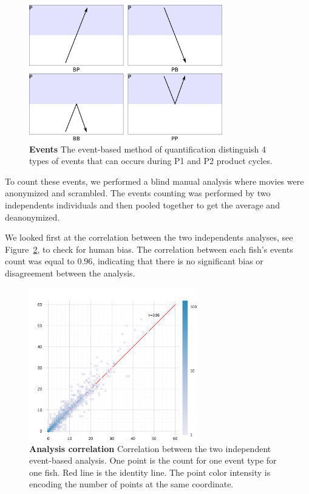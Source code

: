     \begin{figure}[htb]
      \centering
      \includegraphics[width=0.75\textwidth]{part_2/assets/events.png}
      \caption{\textbf{Events} The event-based method of quantification distinguish 4 types of events that can occurs during P1 and P2 product cycles.}
      \label{events}
    \end{figure}

  To count these events, we performed a blind manual analysis where movies were anonymized and scrambled. The events counting was performed by two independents individuals and then pooled together to get the average and deanonymized.

  We looked first at the correlation between the two independents analyses, see Figure~\ref{correlation_count}, to check for human bias. The correlation between each fish's events count was equal to $0.96$, indicating that there is no significant bias or disagreement between the analysis.

    \begin{figure}[htb]
      \centering
      \includegraphics[width=0.65\textwidth]{part_2/assets/correlation.png}
      \caption{\textbf{Analysis correlation} Correlation between the two independent event-based analysis. One point is the count for one event type for one fish. Red line is the identity line. The point color intensity is encoding the number of points at the same coordinate.}
      \label{correlation_count}
    \end{figure}

